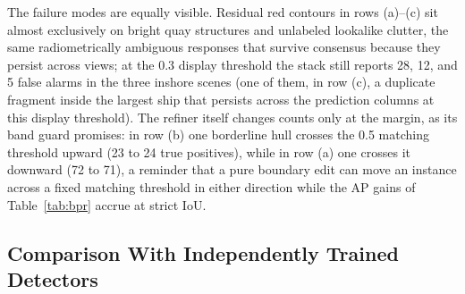 The failure modes are equally visible. Residual red contours in rows (a)--(c) sit almost exclusively on bright quay structures and unlabeled lookalike clutter, the same radiometrically ambiguous responses that survive consensus because they persist across views; at the 0.3 display threshold the stack still reports 28, 12, and 5 false alarms in the three inshore scenes (one of them, in row (c), a duplicate fragment inside the largest ship that persists across the prediction columns at this display threshold). The refiner itself changes counts only at the margin, as its band guard promises: in row (b) one borderline hull crosses the 0.5 matching threshold upward (23 to 24 true positives), while in row (a) one crosses it downward (72 to 71), a reminder that a pure boundary edit can move an instance across a fixed matching threshold in either direction while the AP gains of Table~\ref{tab:bpr} accrue at strict IoU.

\subsection{Comparison With Independently Trained Detectors}\label{sec:exp:qualcmp}

